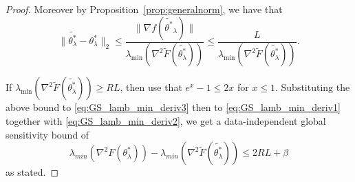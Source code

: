 \begin{proof}
Moreover by Proposition~\ref{prop:generalnorm}, we have that 
$$
\|\tilde{\theta_\lambda^*} - \theta_\lambda^*\|_2 \leq  \frac{\|\nabla f(\tilde{\theta^*}_\lambda)\| }{\lambda_{\min}\left(\nabla^2\tilde{F}(\tilde{\theta_\lambda^*})\right)}  \leq \frac{L}{\lambda_{\min}\left(\nabla^2\tilde{F}(\tilde{\theta_\lambda^*})\right)}.
$$

If $ \lambda_{\min}\left(\nabla^2\tilde{F}(\tilde{\theta_\lambda^*})\right) \geq RL$,  then use that $e^x-1 \leq 2x$ for $x\leq 1$. Substituting the above bound to \eqref{eq:GS_lamb_min_deriv3} then to \eqref{eq:GS_lamb_min_deriv1} together with \eqref{eq:GS_lamb_min_deriv2}, we get a data-independent global sensitivity bound of
$$\lambda_{min}(\nabla^2F(\theta_\lambda^*)) -\lambda_{min}(\nabla^2\tilde{F}(\tilde{\theta_\lambda^*}))  \leq 2RL + \beta$$
as stated.
\end{proof}

